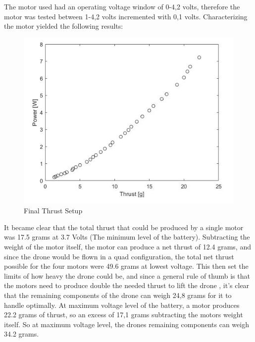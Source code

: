 The motor used had an operating voltage window of 0-4,2 volts, therefore the motor was tested between 1-4,2 volts incremented with 0,1 volts. 
Characterizing the motor yielded the following results:

\begin{figure}
    \includegraphics[width=\linewidth]{pictures/control/Graph Thrust.jpg}
    \caption{Final Thrust Setup}
    \label{fig:Final Thrust Setup}

\end{figure}

It became clear that the total thrust that could be produced by a single motor was 17.5 grams at 3.7 Volts 
(The minimum level of the battery). Subtracting the weight of the motor itself, the motor can produce a net thrust of 12.4 grams, 
and since the drone would be flown in a quad configuration, the total net thrust possible for the four motors were 49.6 grams at lowest voltage. 
This then set the limits of how heavy the drone could be, and since a general rule of thumb is that the motors need to produce double the needed thrust to lift the drone , 
it’s clear that the remaining components of the drone can weigh 24,8 grams for it to handle optimally. At maximum voltage level of the battery, a motor produces 22.2 grams of thrust, 
so an excess of 17,1 grams subtracting the motors weight itself. So at maximum voltage level, the drones remaining components can weigh 34.2 grams.  
